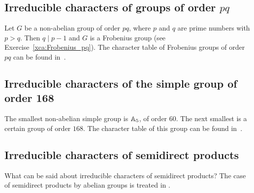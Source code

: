 

\subsection*{Irreducible characters of groups of order $pq$}

Let $G$ be a non-abelian 
group of order $pq$, where 
$p$ and $q$ are prime numbers with $p>q$. Then 
$q\mid p-1$ and $G$ is a Frobenius group (see
Exercise~\ref{xca:Frobenius_pq}). 
The character table of Frobenius groups of order $pq$ can be found in~\cite[Chapter 25]{MR1864147}.

\subsection*{Irreducible characters of the simple group of order 168}

The smallest non-abelian simple group is $\mathbb{A}_5$, of
order $60$. The next smallest
is a certain group of order $168$. The character
table of this group can be found in~\cite[Chapter 27]{MR1864147}. 

\subsection*{Irreducible characters of semidirect products}

What can be said about irreducible characters
of semidirect products? The case of 
semidirect products by abelian groups is treated 
in \cite[Section 8.2]{MR0450380}.



